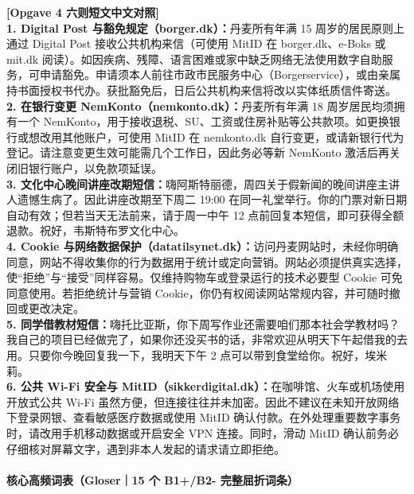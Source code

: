 \begin{transbox}
\small
\textbf{\color{NCDTeal}[Opgave 4 六则短文中文对照]}\\
\textbf{1. Digital Post 与豁免规定（borger.dk）：}丹麦所有年满 15 周岁的居民原则上通过 Digital Post 接收公共机构来信（可使用 MitID 在 borger.dk、e-Boks 或 mit.dk 阅读）。如因疾病、残障、语言困难或家中缺乏网络无法使用数字自助服务，可申请豁免。申请须本人前往市政市民服务中心（Borgerservice），或由亲属持书面授权书代办。获批豁免后，日后公共机构来信将改以实体纸质信件寄送。\\
\textbf{2. 在银行变更 NemKonto（nemkonto.dk）：}丹麦所有年满 18 周岁居民均须拥有一个 NemKonto，用于接收退税、SU、工资或住房补贴等公共款项。如更换银行或想改用其他账户，可使用 MitID 在 nemkonto.dk 自行变更，或请新银行代为登记。请注意变更生效可能需几个工作日，因此务必等新 NemKonto 激活后再关闭旧银行账户，以免款项延误。\\
\textbf{3. 文化中心晚间讲座改期短信：}嗨阿斯特丽德，周四关于假新闻的晚间讲座主讲人遗憾生病了。因此讲座改期至下周二 19:00 在同一礼堂举行。你的门票对新日期自动有效；但若当天无法前来，请于周一中午 12 点前回复本短信，即可获得全额退款。祝好，韦斯特布罗文化中心。\\
\textbf{4. Cookie 与网络数据保护（datatilsynet.dk）：}访问丹麦网站时，未经你明确同意，网站不得收集你的行为数据用于统计或定向营销。网站必须提供真实选择，使“拒绝”与“接受”同样容易。仅维持购物车或登录运行的技术必要型 Cookie 可免同意使用。若拒绝统计与营销 Cookie，你仍有权阅读网站常规内容，并可随时撤回或更改决定。\\
\textbf{5. 同学借教材短信：}嗨托比亚斯，你下周写作业还需要咱们那本社会学教材吗？我自己的项目已经做完了，如果你还没买书的话，非常欢迎从明天下午起借我的去用。只要你今晚回复我一下，我明天下午 2 点可以带到食堂给你。祝好，埃米莉。\\
\textbf{6. 公共 Wi-Fi 安全与 MitID（sikkerdigital.dk）：}在咖啡馆、火车或机场使用开放式公共 Wi-Fi 虽然方便，但连接往往并未加密。因此不建议在未知开放网络下登录网银、查看敏感医疗数据或使用 MitID 确认付款。在外处理重要数字事务时，请改用手机移动数据或开启安全 VPN 连接。同时，滑动 MitID 确认前务必仔细核对屏幕文字，遇到非本人发起的请求请立即拒绝。
\end{transbox}

\paragraph*{核心高频词表（Gloser｜15 个 B1+/B2- 完整屈折词条）}

